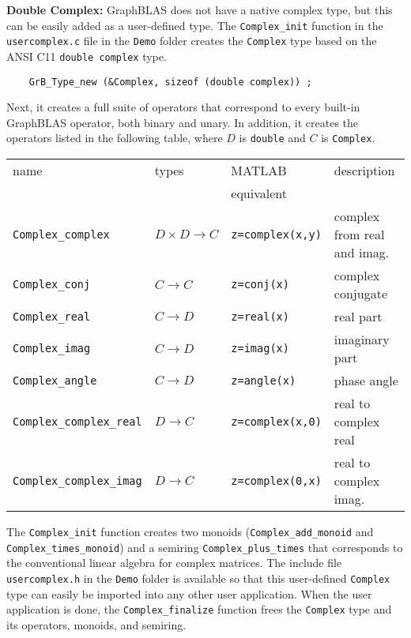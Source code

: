 \documentclass[12pt]{article}
\begin{document}
{\bf Double Complex:}
GraphBLAS does not have a native complex type, but this can be easily added
as a user-defined type.  The \verb'Complex_init' function in the
\verb'usercomplex.c' file in the \verb'Demo' folder creates the
\verb'Complex' type based on the ANSI C11 \verb'double complex' type.

    {\footnotesize
    \begin{verbatim}
    GrB_Type_new (&Complex, sizeof (double complex)) ; \end{verbatim}}

Next, it creates a full suite of operators that correspond to every
built-in GraphBLAS operator, both binary and unary.  In addition, it
creates the operators listed in the following table, where $D$ is
\verb'double' and $C$ is \verb'Complex'.

\vspace{0.1in}
{\footnotesize
\begin{tabular}{llll}
\hline
name                    & types             & MATLAB        & description \\
                        &                   & equivalent    & \\
\hline
\verb'Complex_complex'  & $D \times D \rightarrow C$ & \verb'z=complex(x,y)' & complex from real and imag. \\
\hline
\verb'Complex_conj'     & $C \rightarrow C$ & \verb'z=conj(x)'  & complex conjugate \\
\verb'Complex_real'     & $C \rightarrow D$ & \verb'z=real(x)'  & real part \\
\verb'Complex_imag'     & $C \rightarrow D$ & \verb'z=imag(x)'  & imaginary part \\
\verb'Complex_angle'    & $C \rightarrow D$ & \verb'z=angle(x)' & phase angle \\
\verb'Complex_complex_real'  & $D \rightarrow C$ & \verb'z=complex(x,0)' & real to complex real \\
\verb'Complex_complex_imag'  & $D \rightarrow C$ & \verb'z=complex(0,x)' & real to complex imag. \\
\hline
\end{tabular}
}

The \verb'Complex_init' function creates two monoids (\verb'Complex_add_monoid'
and \verb'Complex_times_monoid') and a semiring \verb'Complex_plus_times' that
corresponds to the conventional linear algebra for complex matrices.  The
include file \verb'usercomplex.h' in the \verb'Demo' folder is available so
that this user-defined \verb'Complex' type can easily be imported into any
other user application.  When the user application is done, the
\verb'Complex_finalize' function frees the \verb'Complex' type and its
operators, monoids, and semiring.
\end{document}
